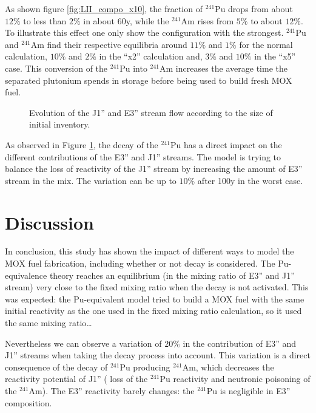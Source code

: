 \documentclass[12pt]{article}
\begin{document}
As shown figure \ref{fig:LII_compo_x10}, the fraction of $^{241}$Pu drops from
about $12\%$ to less than $2\%$ in about 60y, while the $^{241}$Am rises from
$5\%$ to about $12\%$. To illustrate this effect one only show the configuration
with the strongest. $^{241}$Pu and $^{241}$Am find their respective equilibria
around $11\%$ and $1\%$ for the normal calculation, $10\%$ and $2\%$ in the
``x2'' calculation and, $3\%$ and $10\%$ in the ``x5'' case. This conversion of
the $^{241}$Pu into $^{241}$Am increases the average time the separated
plutonium spends in storage before being used to build fresh MOX fuel.

\begin{figure}[h!]
  \centering
  

  \caption{ Evolution of the J1'' and E3'' stream flow according to the size
    of initial inventory. \label{fig:LII} } 
  \end{figure}

As observed in Figure \ref{fig:LII}, the decay of the $^{241}$Pu has a direct
impact on the different contributions of the E3'' and J1'' streams. The model is trying
to balance the loss of reactivity of the J1'' stream by increasing the amount of
E3'' stream in the mix. The variation can be up to $10\%$ after 100y in the worst case.

\section{Discussion}

In conclusion, this study has shown the impact of different ways to model
the MOX fuel fabrication, including whether or not decay is considered.
The Pu-equivalence theory reaches an equilibrium (in the mixing ratio of E3'' and
J1'' stream) very close to the fixed mixing ratio when the decay is not activated.
This was expected: the Pu-equivalent model tried to build a MOX fuel with the same
initial reactivity as the one used in the fixed mixing ratio calculation, so it
used the same mixing ratio\dots  

Nevertheless we can observe a variation of $20\%$ in the contribution of E3'' and J1'' streams  when taking the
decay process into account. This variation is a
direct consequence of the decay of $^{241}$Pu producing $^{241}$Am, which
decreases the reactivity potential of J1'' ( loss of the $^{241}$Pu reactivity
and neutronic poisoning of the $^{241}$Am). The E3'' reactivity barely changes:
the $^{241}$Pu is negligible in E3'' composition.
\end{document}
